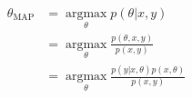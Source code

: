 \begin{answer}
\begin{align*}
\theta_{\operatorname*{MAP}}&=\operatorname*{argmax}_\theta p(\theta|x,y)\\
&=\operatorname*{argmax}_\theta\frac{p(\theta,x,y)}{p(x,y)} \\
&=\operatorname*{argmax}_\theta\frac{p(y|x,\theta)p(x,\theta)}{p(x,y)} 
\end{align*}
\end{answer}
